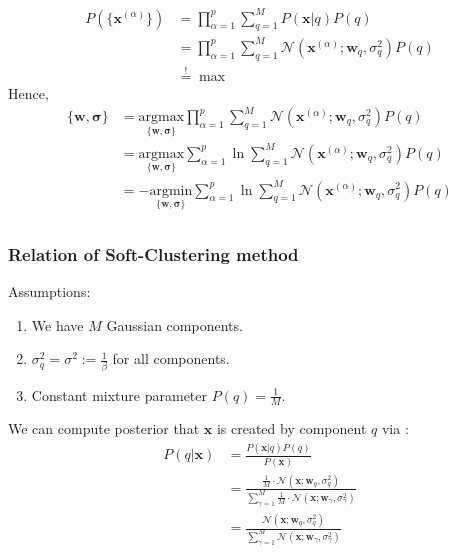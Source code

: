 \begin{align*}
	P(\{ \boldsymbol{x}^{(\alpha)} \}) &=\prod_{\alpha=1}^{p} \sum_{q=1}^{M} P(\boldsymbol{x}|q)P(q) \\
	&= \prod_{\alpha=1}^{p} \sum_{q=1}^{M} \mathcal{N}(\boldsymbol{x}^{(\alpha)}; \boldsymbol{w}_q, \sigma_q^2) P(q) \\
	&\stackrel{!}{=} \max
\end{align*}
Hence,
\begin{align*}
	\{ \boldsymbol{w}, \boldsymbol{\sigma} \} &= \underset{ \{\boldsymbol{w}, \boldsymbol{\sigma}\}}{\text{argmax}} \prod_{\alpha=1}^{p} \sum_{q=1}^{M} \mathcal{N}(\boldsymbol{x}^{(\alpha)}; \boldsymbol{w}_q, \sigma_q^2) P(q) \\
	&= \underset{ \{\boldsymbol{w}, \boldsymbol{\sigma}\}}{\text{argmax}} \sum_{\alpha=1}^{p}  \ln\sum_{q=1}^{M} \mathcal{N}(\boldsymbol{x}^{(\alpha)}; \boldsymbol{w}_q, \sigma_q^2) P(q) \\
	&= - \underset{ \{\boldsymbol{w}, \boldsymbol{\sigma}\}}{\text{argmin}} \sum_{\alpha=1}^{p}  \ln\sum_{q=1}^{M} \mathcal{N}(\boldsymbol{x}^{(\alpha)}; \boldsymbol{w}_q, \sigma_q^2) P(q) \\
\end{align*}

\subsubsection{Relation of Soft-Clustering method}
Assumptions:
\begin{enumerate}
	\item We have $M$ Gaussian components.
	\item $\sigma_q^2 = \sigma^2 := \frac{1}{\beta}$ for all components.
	\item Constant mixture parameter $P(q) = \frac{1}{M}$.
\end{enumerate}

We can compute posterior that $\boldsymbol{x}$ is created by  component $q$ via :
\begin{align*}
	P(q| \boldsymbol{x}) &= \frac{ P(\boldsymbol{x} | q)P(q) }{P(\boldsymbol{x}) } 
\\
	&= \frac{ \frac{1}{M} \cdot \mathcal{N}(\boldsymbol{x}; \boldsymbol{w}_q, \sigma_q^2 )  }{ \sum_{\gamma=1}^{M} \frac{1}{M} \cdot \mathcal{N}(\boldsymbol{x}; \boldsymbol{w}_\gamma, \sigma_\gamma^2 )  } \\
	&= \frac{  \mathcal{N}(\boldsymbol{x}; \boldsymbol{w}_q, \sigma_q^2 )  }{ \sum_{\gamma=1}^{M}  \mathcal{N}(\boldsymbol{x}; \boldsymbol{w}_\gamma, \sigma_\gamma^2 )  } 
\end{align*}

